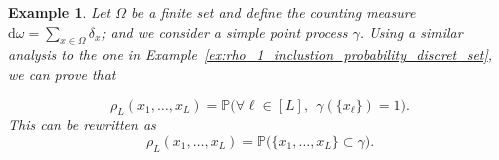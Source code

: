\documentclass[twoside,11pt]{book}
\newtheorem{example}{Example}
\numberwithin{theorem}{chapter}
\numberwithin{definition}{chapter}
\numberwithin{proposition}{chapter}
\numberwithin{corollary}{chapter}
\numberwithin{example}{chapter}
\numberwithin{lemma}{chapter}
\begin{document}
\begin{example}\label{ex:rho_L_inclustion_probability_discret_set}
Let $\Omega$ be a finite set and define the counting measure $\mathrm{d}\omega = \sum\limits_{x \in \Omega} \delta_x$; and we consider a simple point process $\gamma$. Using a similar analysis to the one in Example~\ref{ex:rho_1_inclustion_probability_discret_set}, we can prove that

\begin{equation}
\rho_{L}(x_{1}, \dots, x_{L}) = \mathbb{P} \bigg(\forall \ell \in [L], \:\: \gamma(\{x_\ell\}) = 1 \bigg).
\end{equation}
This can be rewritten as
\begin{equation}
\rho_{L}(x_{1}, \dots, x_{L}) = \mathbb{P} \bigg(\{x_{1}, \dots, x_{L} \} \subset \gamma \bigg).
\end{equation}

\end{example}
\end{document}
